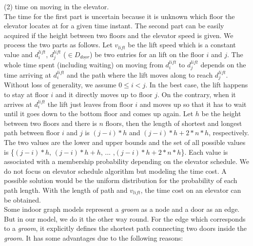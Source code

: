 (2) time on moving in the elevator. \\

The time for the first part is uncertain because it is unknown which floor the elevator locates at
for a given time instant. The second part can be easily acquired if the height between two floors and
the elevator speed is given. We process the two parts as follows. Let $v_{lift}$ be the lift speed which is a constant value and 
$d^{lift}_i$, $d^{lift}_j$ ($\in D_{\underline{door}}$) be two entries for an lift on the floor 
$i$ and $j$. The whole time spent (including waiting) on moving from $d^{lift}_i$ to $d^{lift}_j$ 
depends on the time arriving at $d^{lift}_i$ and the path where the lift moves along to reach 
$d^{lift}_j$. Without loss of generality, we assume $0\leq i<j$. In the best case, the lift 
happens to stay at floor $i$ and it directly moves up to floor $j$. On the contrary, when
it arrives at $d^{lift}_i$ the lift just leaves from floor $i$ and moves up so that it has 
to wait until it goes down to the bottom floor and comes up again. 
Let $h$ be the height between two floors and there is $n$ floors, then the length of 
shortest and longest path between floor $i$ and $j$ is $(j-i)*h$ and $(j-i)*h+2*n*h$, respectively. 
The two values are the lower and upper bounds and the set of all possible values is 
\{$(j-i)*h$, $(j-i)*h+h$, ... ,$(j-i)*h+2*n*h$\}. Each value is associated with a membership probability depending on the elevator schedule. We do not focus on elevator schedule algorithm but modeling the time cost. A possible solution would be the uniform distribution for the probability of each path length. With the length of path and $v_{lift}$, the time cost on an elevator can be obtained. \\

Some indoor graph models \cite{LOS06,JLY209} represent a \textit{groom} as a node and a door 
as an edge. But in our model, we do it the other way round. For the edge which corresponds
to a \textit{groom}, it explicitly defines the shortest path connecting two
doors inside the \textit{groom}. It has some advantages due to the following reasons:  

